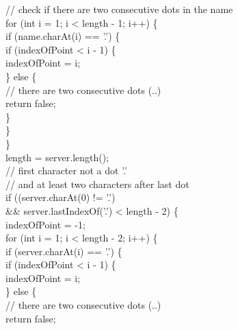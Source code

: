 \begin{java}
\jtabf                        // check if there are two consecutive dots in the name\\
\jtabf                        for (int i = 1; i < length - 1; i++) \{\\
\jtabf                                if (name.charAt(i) == '.') \{\\
\jtabf                                        if (indexOfPoint < i - 1) \{\\
\jtabf                                                indexOfPoint = i;\\
\jtabf                                        \} else \{\\
\jtabf                        // there are two consecutive dots (..)\\
\jtabf                                                return false;\\
\jtabf                                        \}\\
\jtabf                                \}\\
\jtabf                        \}\\
\jtabf                        length = server.length();\\
\jtabf                        // first character not a dot '.'\\ 
\jtabf                    // and at least two characters after last dot\\
\jtabf                        if ((server.charAt(0) != '.')\\
\jtabf                \&\& server.lastIndexOf('.') < length - 2) \{\\
\jtabf                                indexOfPoint = -1;\\
\jtabf                                for (int i = 1; i < length - 2; i++) \{\\
\jtabf                                        if (server.charAt(i) == '.') \{\\
\jtabf                                                if (indexOfPoint < i - 1) \{ \\
\jtabf                                                    indexOfPoint = i;\\
\jtabf                                                \} else \{\\
\jtabf                                // there are two consecutive dots (..)\\
\jtabf                                                        return false;\\

\end{java}
